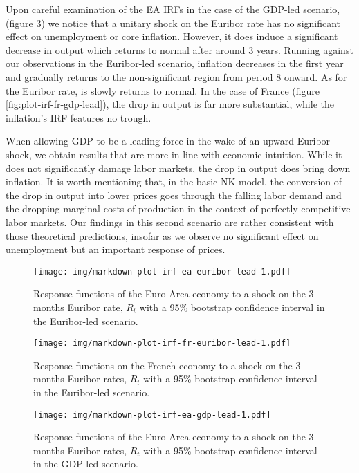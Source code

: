 \documentclass[
  11pt,
]{article}
\begin{document}
Upon careful examination of the EA IRFs in the case of the GDP-led scenario, (figure \ref{fig:plot-irf-ea-gdp-lead}) we notice that a unitary shock on the Euribor rate has no significant effect on unemployment or core inflation.
However, it does induce a significant decrease in output which returns to normal after around 3 years.
Running against our observations in the Euribor-led scenario, inflation decreases in the first year and gradually returns to the non-significant region from period 8 onward.
As for the Euribor rate, is slowly returns to normal.
In the case of France (figure \ref{fig:plot-irf-fr-gdp-lead}), the drop in output is far more substantial, while the inflation's IRF features no trough.

When allowing GDP to be a leading force in the wake of an upward Euribor shock, we obtain results that are more in line with economic intuition.
While it does not significantly damage labor markets, the drop in output does bring down inflation.
It is worth mentioning that, in the basic NK model, the conversion of the drop in output into lower prices goes through the falling labor demand and the dropping marginal costs of production in the context of perfectly competitive labor markets.
Our findings in this second scenario are rather consistent with those theoretical predictions, insofar as we observe no significant effect on unemployment but an important response of prices.

\begin{figure}
\centering
\texttt{[image: img/markdown-plot-irf-ea-euribor-lead-1.pdf]}
\caption{\label{fig:plot-irf-ea-euribor-lead}Response functions of the Euro Area economy to a shock on the 3 months Euribor rate, \(R_t\) with a 95\% bootstrap confidence interval in the Euribor-led scenario.}
\end{figure}

\begin{figure}
\centering
\texttt{[image: img/markdown-plot-irf-fr-euribor-lead-1.pdf]}
\caption{\label{fig:plot-irf-fr-euribor-lead}Response functions on the French economy to a shock on the 3 months Euribor rates, \(R_t\) with a 95\% bootstrap confidence interval in the Euribor-led scenario.}
\end{figure}

\begin{figure}
\centering
\texttt{[image: img/markdown-plot-irf-ea-gdp-lead-1.pdf]}
\caption{\label{fig:plot-irf-ea-gdp-lead}Response functions of the Euro Area economy to a shock on the 3 months Euribor rates, \(R_t\) with a 95\% bootstrap confidence interval in the GDP-led scenario.}
\end{figure}
\end{document}
